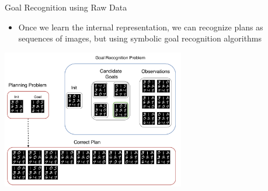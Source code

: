 \documentclass[usenames,dvipsnames]{beamer}
\begin{document}
\begin{frame}[c]{Goal Recognition using Raw Data}
	\begin{itemize}
		\item Once we learn the internal representation, we can recognize plans as sequences of images, but using symbolic goal recognition algorithms
	\end{itemize}
	\begin{center}
		\includegraphics[width=8cm]{fig/lat_rec_problem.pdf}
	\end{center}
\end{frame}
\end{document}
